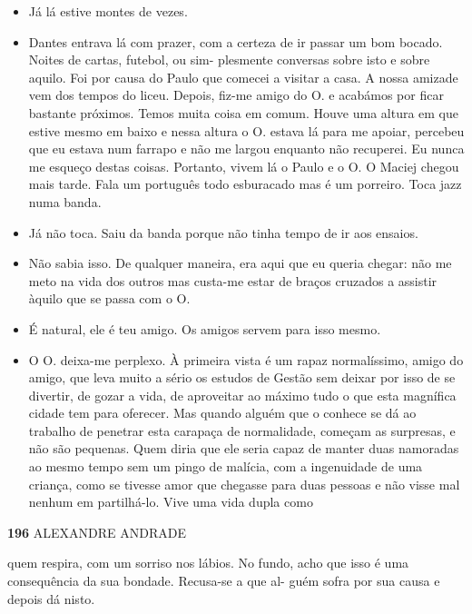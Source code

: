 \begin{itemize}
\tightlist
\item
  Já lá estive montes de vezes.
\item
  Dantes entrava lá com prazer, com a certeza de ir passar um bom
  bocado. Noites de cartas, futebol, ou sim- plesmente conversas sobre
  isto e sobre aquilo. Foi por causa do Paulo que comecei a visitar a
  casa. A nossa amizade vem dos tempos do liceu. Depois, fiz-me amigo do
  O. e acabámos por ficar bastante próximos. Temos muita coisa em comum.
  Houve uma altura em que estive mesmo em baixo e nessa altura o O.
  estava lá para me apoiar, percebeu que eu estava num farrapo e não me
  largou enquanto não recuperei. Eu nunca me esqueço destas coisas.
  Portanto, vivem lá o Paulo e o O. O Maciej chegou mais tarde. Fala um
  português todo esburacado mas é um porreiro. Toca jazz numa banda.
\item
  Já não toca. Saiu da banda porque não tinha tempo de ir aos ensaios.
\item
  Não sabia isso. De qualquer maneira, era aqui que eu queria chegar:
  não me meto na vida dos outros mas custa-me estar de braços cruzados a
  assistir àquilo que se passa com o O.
\item
  É natural, ele é teu amigo. Os amigos servem para isso mesmo.
\item
  O O. deixa-me perplexo. À primeira vista é um rapaz normalíssimo,
  amigo do amigo, que leva muito a sério os estudos de Gestão sem deixar
  por isso de se divertir, de gozar a vida, de aproveitar ao máximo tudo
  o que esta magnífica cidade tem para oferecer. Mas quando alguém que o
  conhece se dá ao trabalho de penetrar esta carapaça de normalidade,
  começam as surpresas, e não são pequenas. Quem diria que ele seria
  capaz de manter duas namoradas ao mesmo tempo sem um pingo de malícia,
  com a ingenuidade de uma criança, como se tivesse amor que chegasse
  para duas pessoas e não visse mal nenhum em partilhá-lo. Vive uma vida
  dupla como
\end{itemize}

\textbf{196 }ALEXANDRE ANDRADE

quem respira, com um sorriso nos lábios. No fundo, acho que isso é uma
consequência da sua bondade. Recusa-se a que al- guém sofra por sua
causa e depois dá nisto.

